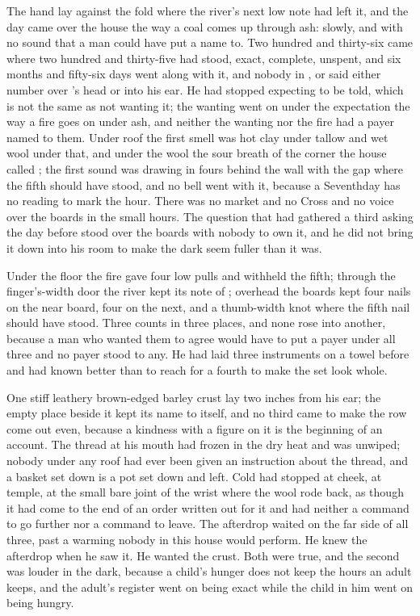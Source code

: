 
The hand lay against the fold where the river's next low note had left it, and the day came over the house the way a coal comes up through ash: slowly, and with no sound that a man could have put a name to. Two hundred and thirty-six came where two hundred and thirty-five had stood, exact, complete, unspent, and six months and fifty-six days went along with it, and nobody in ,  or  said either number over 's head or into his ear. He had stopped expecting to be told, which is not the same as not wanting it; the wanting went on under the expectation the way a fire goes on under ash, and neither the wanting nor the fire had a payer named to them. Under  roof the first smell was hot clay under tallow and wet wool under that, and under the wool the sour breath of the corner the house called ; the first sound was  drawing in fours behind the wall with the gap where the fifth should have stood, and no bell went with it, because a Seventhday has no reading to mark the hour. There was no market and no Cross and no voice over the boards in the small hours. The question that had gathered a third asking the day before stood over the boards with nobody to own it, and he did not bring it down into his room to make the dark seem fuller than it was.

Under the floor the fire gave four low pulls and withheld the fifth; through the finger's-width door the river kept its note of ; overhead the boards kept four nails on the near board, four on the next, and a thumb-width knot where the fifth nail should have stood. Three counts in three places, and none rose into another, because a man who wanted them to agree would have to put a payer under all three and no payer stood to any. He had laid three instruments on a towel before and had known better than to reach for a fourth to make the set look whole.

One stiff leathery brown-edged barley crust lay two inches from his ear; the empty place beside it kept its name to itself, and no third came to make the row come out even, because a kindness with a figure on it is the beginning of an account. The thread at his mouth had frozen in the dry heat and was unwiped; nobody under any roof had ever been given an instruction about the thread, and a basket set down is a pot set down and left. Cold had stopped at cheek, at temple, at the small bare joint of the wrist where the wool rode back, as though it had come to the end of an order written out for it and had neither a command to go further nor a command to leave. The afterdrop waited on the far side of all three, past a warming nobody in this house would perform. He knew the afterdrop when he saw it. He wanted the crust. Both were true, and the second was louder in the dark, because a child's hunger does not keep the hours an adult keeps, and the adult's register went on being exact while the child in him went on being hungry.

